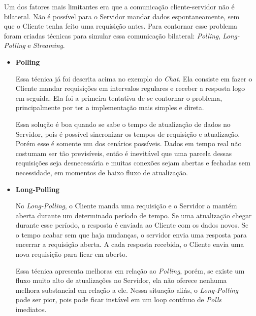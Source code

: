 \documentclass[a4paper,12pt]{article}
\begin{document}
Um dos fatores mais limitantes era que a comunicação cliente-servidor não é bilateral. Não é possível para o Servidor mandar dados espontaneamente, sem que o Cliente tenha feito uma requisição antes. Para contornar esse problema foram criadas técnicas para simular essa comunicação bilateral: \emph{Polling}, \emph{Long-Polling} e \emph{Streaming}.


\begin{itemize}

    \item \textbf{Polling}

    Essa técnica já foi descrita acima no exemplo do \emph{Chat}. Ela consiste em fazer o Cliente mandar requisições em intervalos regulares e receber a resposta logo em seguida. Ela foi a primeira tentativa de se contornar o problema, principalmente por ter a implementação mais simples e direta.

    Essa solução é boa quando se sabe o tempo de atualização de dados no Servidor, pois é possível sincronizar os tempos de requisição e atualização. Porém esse é somente um dos cenários possíveis. Dados em tempo real não costumam ser tão previsíveis, então é inevitável que uma parcela dessas requisições seja desnecessária e muitas conexões sejam abertas e fechadas sem necessidade, em momentos de baixo fluxo de atualização.


    \item \textbf{Long-Polling}

    No \emph{Long-Polling}, o Cliente manda uma requisição e o Servidor a mantém aberta durante um determinado período de tempo. Se uma atualização chegar durante esse período, a resposta é enviada ao Cliente com os dados novos. Se o tempo acabar sem que haja mudanças, o servidor envia uma resposta para encerrar a requisição aberta. A cada resposta recebida, o Cliente envia uma nova requisição para ficar em aberto.

    Essa técnica apresenta melhoras em relação ao \emph{Polling}, porém, se existe um fluxo muito alto de atualizações no Servidor, ela não oferece nenhuma melhora substancial em relação a ele. Nessa situação aliás, o \emph{Long-Polling} pode ser pior, pois pode ficar instável em um loop contínuo de \emph{Polls} imediatos.



\end{itemize}
\end{document}
